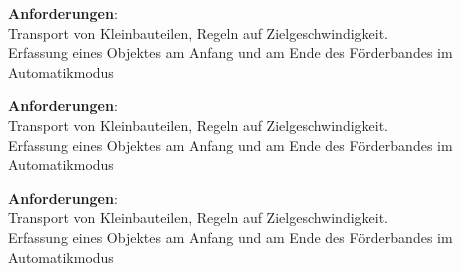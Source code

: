 { 
	\textbf{Anforderungen}:\\
	Transport von Kleinbauteilen, Regeln auf Zielgeschwindigkeit.\\ 
	Erfassung  eines Objektes am Anfang und am Ende des Förderbandes im Automatikmodus 


} 
{ 
	\textbf{Anforderungen}:\\
	Transport von Kleinbauteilen, Regeln auf Zielgeschwindigkeit.\\ 
	Erfassung  eines Objektes am Anfang und am Ende des Förderbandes im Automatikmodus 
	
	
} 
{ 
	\textbf{Anforderungen}:\\
	Transport von Kleinbauteilen, Regeln auf Zielgeschwindigkeit.\\ 
	Erfassung  eines Objektes am Anfang und am Ende des Förderbandes im Automatikmodus 
	

} 






